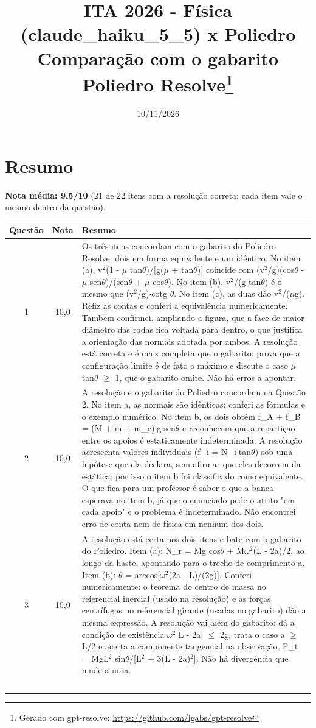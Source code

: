 \documentclass{article}%
\title{ITA 2026 {-} Física (claude\_haiku\_5\_5) x Poliedro\\[4pt]\large Comparação com o gabarito Poliedro Resolve\thanks{Gerado com gpt-resolve: \url{https://github.com/lgabs/gpt-resolve}}}%
\date{10/11/2026}%
\begin{document}
%
\normalsize%
\maketitle%
\section*{Resumo}\textbf{Nota média: 9,5/10} (21 de 22 itens com a resolução correta; cada item vale o mesmo dentro da questão).\par\medskip%
\begin{longtable}{@{}c c p{}@{}}\toprule Questão & Nota & Resumo \\ \midrule
1 & 10,0 & Os três itens concordam com o gabarito do Poliedro Resolve: dois em forma equivalente e um idêntico. No item (a), v$^2$(1 - $\mu$ tan$\theta$)/{[}g($\mu$ + tan$\theta$){]} coincide com (v$^2$/g)(cos$\theta$ - $\mu$ sen$\theta$)/(sen$\theta$ + $\mu$ cos$\theta$). No item (b), v$^2$/(g tan$\theta$) é o mesmo que (v$^2$/g)$\cdot$cotg $\theta$. No item (c), as duas dão v$^2$/($\mu$g). Refiz as contas e conferi a equivalência numericamente. Também confirmei, ampliando a figura, que a face de maior diâmetro das rodas fica voltada para dentro, o que justifica a orientação das normais adotada por ambos. A resolução está correta e é mais completa que o gabarito: prova que a configuração limite é de fato o máximo e discute o caso $\mu$ tan$\theta$ $\geq$ 1, que o gabarito omite. Não há erros a apontar. \\
2 & 10,0 & A resolução e o gabarito do Poliedro concordam na Questão 2. No item a, as normais são idênticas; conferi as fórmulas e o exemplo numérico. No item b, os dois obtêm f\_A + f\_B = (M + m + m\_c)$\cdot$g$\cdot$sen$\theta$ e reconhecem que a repartição entre os apoios é estaticamente indeterminada. A resolução acrescenta valores individuais (f\_i = N\_i$\cdot$tan$\theta$) sob uma hipótese que ela declara, sem afirmar que eles decorrem da estática; por isso o item b foi classificado como equivalente. O que fica para um professor é saber o que a banca esperava no item b, já que o enunciado pede o atrito "em cada apoio" e o problema é indeterminado. Não encontrei erro de conta nem de física em nenhum dos dois. \\
3 & 10,0 & A resolução está certa nos dois itens e bate com o gabarito do Poliedro. Item (a): N\_r = Mg cos$\theta$ + M$\omega$$^2$(L - 2a)/2, ao longo da haste, apontando para o trecho de comprimento a. Item (b): $\theta$ = arccos{[}$\omega$$^2$(2a - L)/(2g){]}. Conferi numericamente: o teorema do centro de massa no referencial inercial (usado na resolução) e as forças centrífugas no referencial girante (usadas no gabarito) dão a mesma expressão. A resolução vai além do gabarito: dá a condição de existência $\omega$$^2$|L - 2a| $\leq$ 2g, trata o caso a $\geq$ L/2 e acerta a componente tangencial na observação, F\_t = MgL$^2$ sin$\theta$/{[}L$^2$ + 3(L - 2a)$^2${]}. Não há divergência que mude a nota. \\
$$
\end{longtable}
\end{document}
